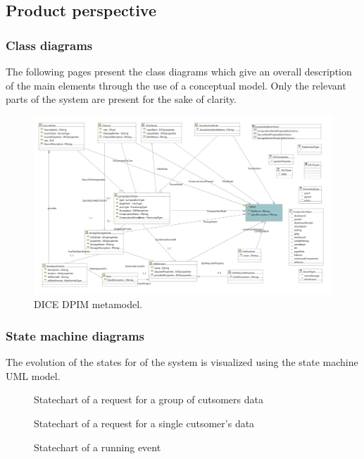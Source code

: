 \subsection{Product perspective}
\subsubsection{Class diagrams}
The following pages present the class diagrams which give an overall description of the main elements through the use of a conceptual model. Only the relevant parts of the system are present for the sake of clarity.
\begin{figure}
\centering
\includegraphics[width=\textwidth]{Images/11.png}
\caption{\label{fig:metamodel}DICE DPIM metamodel.}
\end{figure}

\newpage
\subsubsection{State machine diagrams}

The evolution of the states for of the system is visualized using the state machine UML model.

{\todo
    \begin{figure}[H]
        \caption{Statechart of a request for a group of cutsomers data}
        \label{fig:statemachine_grpreq}
    \end{figure}

    \begin{figure}[H]
        \caption{Statechart of a request for a single cutsomer's data}
        \label{fig:statemachine_specreq}
    \end{figure}

    \begin{figure}[H]
        \caption{Statechart of a running event}
        \label{fig:statemachine_runevent}
    \end{figure}
}


